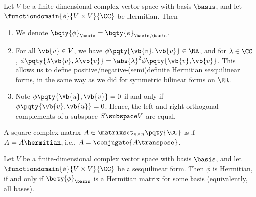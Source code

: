 \begin{remarks}
    Let \(V\) be a finite-dimensional complex vector space with basis \(\basis\), and let \(\functiondomain{\phi}{V \times V}{\CC}\) be Hermitian. Then
    \begin{enumerate}[label=(\roman*)]
        \item We denote \(\bqty{\phi}_{\basis} = \bqty{\phi}_{\basis, \basis}\).
        \item For all \(\vb{v} \in V\), we have \(\phi\pqty{\vb{v}, \vb{v}} \in \RR\), and for \(\lambda \in \CC\), \(\phi\pqty{\lambda \vb{v}, \lambda \vb{v}} = \abs{\lambda}^2 \phi\pqty{\vb{v}, \vb{v}}\). This allows us to define positive/negative-(semi)definite Hermitian sesquilinear forms, in the same way as we did for symmetric bilinear forms on \(\RR\).
        \item Note \(\phi\pqty{\vb{u}, \vb{v}} = 0\) if and only if \(\phi\pqty{\vb{v}, \vb{u}} = 0\). Hence, the left and right orthogonal complements of a subspace \(S \subspace V\) are equal.
    \end{enumerate}
\end{remarks}

\begin{definition}
    A square complex matrix \(A \in \matrixset_{n \times n} \pqty{\CC}\) is  if \(A = A\hermitian\), i.e., \(A = \conjugate{A\transpose}\).
\end{definition}

\begin{lemma}
    \label{lem:hermitian-sesquilinear-forms-hermitian-matrices}%
    Let \(V\) be a finite-dimensional complex vector space with basis \(\basis\), and let \(\functiondomain{\phi}{V \times V}{\CC}\) be a sesquilinear form. Then \(\phi\) is Hermitian, if and only if \(\bqty{\phi}_{\basis}\) is a Hermitian matrix for some basis (equivalently, all bases).
\end{lemma}

